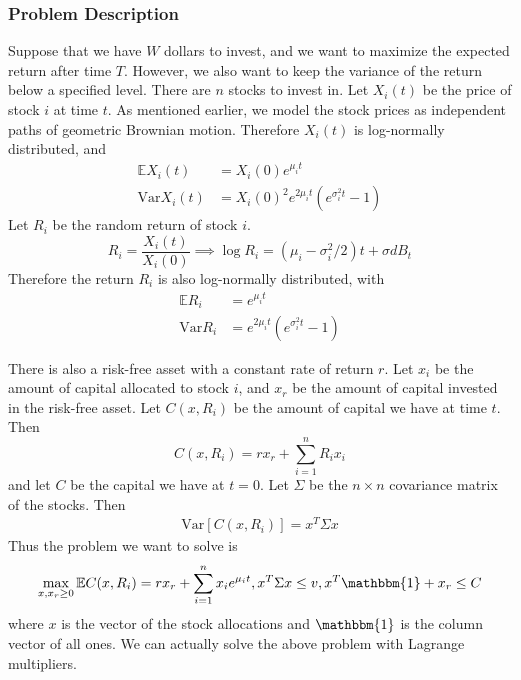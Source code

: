 \documentclass{amsart}
\theoremstyle{definition}
\theoremstyle{remark}
\begin{document}
\subsubsection{Problem Description}
Suppose that we have $W$ dollars to invest, and we want to maximize the expected return after time $T$. However, we also want to keep the variance of the return below a specified level. There are $n$ stocks to invest in. Let $X_i(t)$ be the price of stock $i$ at time $t$. As mentioned earlier, we model the stock prices as independent paths of geometric Brownian motion. Therefore $X_i(t)$ is log-normally distributed, and
\begin{align*}
\mathbb{E} X_i(t) &= X_i(0)e^{\mu_i t}\\
\text{Var} X_i(t) &= X_i(0)^2e^{2\mu_i t}\left(e^{\sigma_i^2 t} -1\right)
\end{align*}
Let $R_i$ be the random return of stock $i$.
\begin{equation*}
R_i = \frac{X_i(t)}{X_i(0)} \implies \log R_i = (\mu_i - \sigma_i^2 / 2) t + \sigma dB_t
\end{equation*}
Therefore the return $R_i$ is also log-normally distributed, with
\begin{align*}
\mathbb{E}R_i &= e^{\mu_i t}\\
\text{Var}R_i &= e^{2\mu_i t}\left(e^{\sigma_i^2 t} -1\right)
\end{align*}

There is also a risk-free asset with a constant rate of return $r$. Let $x_i$ be the amount of capital allocated to stock $i$, and $x_r$ be the amount of capital invested in the risk-free asset. Let $C(x, R_i)$ be the amount of capital we have at time $t$. Then
\begin{equation*}
C(x, R_i) = r x_r + \sum_{i=1}^n R_i x_i 
\end{equation*}
and let $C$ be the capital we have at $t=0$.
Let $\Sigma$ be the $n\times n$ covariance matrix of the stocks. Then
\begin{align*}
\text{Var}[ C(x,R_i)] = x^T \Sigma x
\end{align*}
Thus the problem we want to solve is
\begin{equation}\label{eq:markowitz}
\max_{x,x_r\ge 0} \mathbb{E}C(x, R_i) = r x_r + \sum_{i=1}^n x_i e^{\mu_i t}, x^T \Sigma x \le v, x^T \mathbbm{1} + x_r \le C
\end{equation}
where $x$ is the vector of the stock allocations and $\mathbbm{1}$ is the column vector of all ones.
We can actually solve the above problem with Lagrange multipliers.
\end{document}
